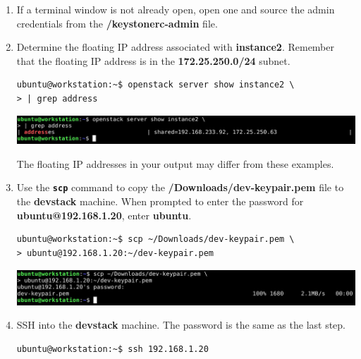 \documentclass[letterpaper, 12pt]{article}
\begin{document}
\begin{enumerate}
    \item If a terminal window is not already open, open one and source the admin credentials from the 
    \textbf{\texttildemid/keystonerc-admin} file.

    \item Determine the floating IP address associated with \textbf{instance2}. Remember that the floating IP address is
    in the \textbf{172.25.250.0/24} subnet.
\begin{lstlisting}
ubuntu@workstation:~$ openstack server show instance2 \
> | grep address
\end{lstlisting}

    \begin{center}
        \includegraphics[width=\linewidth]{images/part2/step2.png}
    \end{center}

    \begin{notebox}
        The floating IP addresses in your output may differ from these examples.
    \end{notebox}

    \item Use the \textbf{\texttt{scp}} command to copy the \textbf{\texttildemid/Downloads/dev-keypair.pem} file to
    the \textbf{devstack} machine. When prompted to enter the password for \textbf{ubuntu@192.168.1.20}, enter
    \textbf{ubuntu}.
\begin{lstlisting}
ubuntu@workstation:~$ scp ~/Downloads/dev-keypair.pem \
> ubuntu@192.168.1.20:~/dev-keypair.pem
\end{lstlisting}

    \begin{center}
        \includegraphics[width=\linewidth]{images/part2/step3.png}
    \end{center}

    \item SSH into the \textbf{devstack} machine. The password is the same as the last step.
\begin{lstlisting}
ubuntu@workstation:~$ ssh 192.168.1.20
\end{lstlisting}


\end{enumerate}
\end{document}
